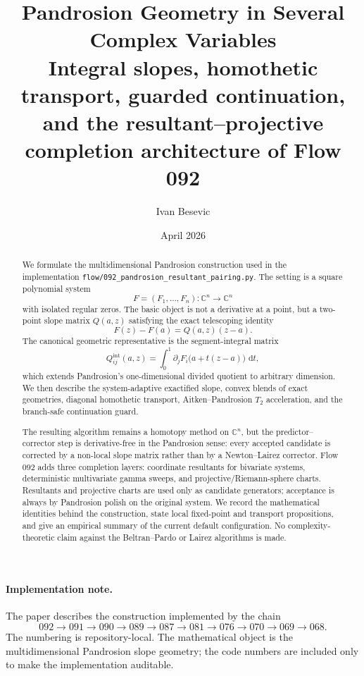 \documentclass[11pt,a4paper]{article}
\title{\textbf{Pandrosion Geometry in Several Complex Variables}\\[0.35em]
\large Integral slopes, homothetic transport, guarded continuation,\\
and the resultant--projective completion architecture of Flow 092}
\author{Ivan Besevic}
\date{April 2026}
\theoremstyle{definition}
\theoremstyle{plain}
\theoremstyle{remark}
\newcommand{\C}{\mathbb C}
\newcommand{\dd}{\,\mathrm d}
\begin{document}
\maketitle

\begin{abstract}
We formulate the multidimensional Pandrosion construction used in the
implementation \texttt{flow/092\_pandrosion\_resultant\_pairing.py}.  The
setting is a square polynomial system
\[
  F=(F_1,\ldots,F_n):\C^n\longrightarrow\C^n
\]
with isolated regular zeros.  The basic object is not a derivative at a point,
but a two-point slope matrix \(Q(a,z)\) satisfying the exact telescoping
identity
\[
  F(z)-F(a)=Q(a,z)(z-a).
\]
The canonical geometric representative is the segment-integral matrix
\[
  Q^{\mathrm{int}}_{ij}(a,z)
  =
  \int_0^1
  \partial_jF_i\bigl(a+t(z-a)\bigr)\,\dd t,
\]
which extends Pandrosion's one-dimensional divided quotient to arbitrary
dimension.  We then describe the system-adaptive exactified slope, convex
blends of exact geometries, diagonal homothetic transport, Aitken--Pandrosion
\(T_2\) acceleration, and the branch-safe continuation guard.

The resulting algorithm remains a homotopy method on \(\C^n\), but the
predictor--corrector step is derivative-free in the Pandrosion sense: every
accepted candidate is corrected by a non-local slope matrix rather than by a
Newton--Lairez corrector.  Flow 092 adds three completion layers: coordinate
resultants for bivariate systems, deterministic multivariate gamma sweeps, and
projective/Riemann-sphere charts.  Resultants and projective charts are used
only as candidate generators; acceptance is always by Pandrosion polish on the
original system.  We record the mathematical identities behind the construction,
state local fixed-point and transport propositions, and give an empirical
summary of the current default configuration.  No complexity-theoretic claim
against the Beltran--Pardo or Lairez algorithms is made.
\end{abstract}

\paragraph{Implementation note.}
The paper describes the construction implemented by the chain
\[
092\to091\to090\to089\to087\to081\to076\to070\to069\to068.
\]
The numbering is repository-local.  The mathematical object is the
multidimensional Pandrosion slope geometry; the code numbers are included only
to make the implementation auditable.
\end{document}
